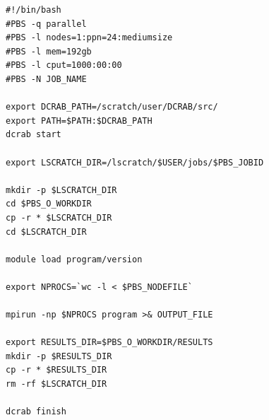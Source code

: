 \documentclass[10pt,a4paper]{report}
\begin{document}
\pagebreak

\begin{verbatim}
#!/bin/bash
#PBS -q parallel
#PBS -l nodes=1:ppn=24:mediumsize
#PBS -l mem=192gb
#PBS -l cput=1000:00:00
#PBS -N JOB_NAME

export DCRAB_PATH=/scratch/user/DCRAB/src/
export PATH=$PATH:$DCRAB_PATH
dcrab start

export LSCRATCH_DIR=/lscratch/$USER/jobs/$PBS_JOBID

mkdir -p $LSCRATCH_DIR
cd $PBS_O_WORKDIR
cp -r * $LSCRATCH_DIR
cd $LSCRATCH_DIR

module load program/version

export NPROCS=`wc -l < $PBS_NODEFILE`

mpirun -np $NPROCS program >& OUTPUT_FILE

export RESULTS_DIR=$PBS_O_WORKDIR/RESULTS
mkdir -p $RESULTS_DIR
cp -r * $RESULTS_DIR
rm -rf $LSCRATCH_DIR

dcrab finish
\end{verbatim}
\end{document}
